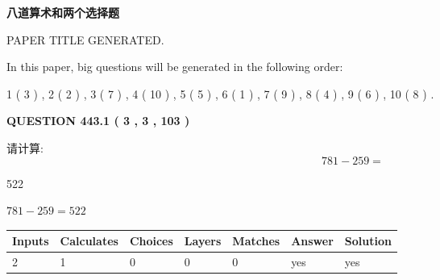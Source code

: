\documentclass{ctexart}
\begin{document}
   
\vspace{0.2in}
   
   
   
   
   
   
   
   
 \vspace{0.2in}
{\LARGE {\textbf{ 八道算术和两个选择题}}}
   
   
 PAPER TITLE GENERATED.
   
   
   
\vspace{0.2in}
   
In this paper, big questions will be generated in the following order: 
   
   
   1 ( 3 )
 ,
   2 ( 2 )
 ,
   3 ( 7 )
 ,
   4 ( 10 )
 ,
   5 ( 5 )
 ,
   6 ( 1 )
 ,
   7 ( 9 )
 ,
   8 ( 4 )
 ,
   9 ( 6 )
 ,
   10 ( 8 )
 .
  
\vspace{0.2in}
  
{\textbf{\Large{QUESTION
443.1 
 ( 3 , 3 , 103 )
}}}
  
  
 
请计算:
\begin{equation}
781 -   %
259 = \nonumber
\end{equation}
 
 
 
\noindent{}
 
 

522
 
 
\noindent{}
 
 

 
 
 
\noindent{}
 
 

$ %
781 -  %
259=   %
522$
 
 
\noindent{}
 
 

 
   
   
   
   
\noindent\begin{tabular}{|l|l|l|l|l|l|l|}
 \hline
Inputs & Calculates & Choices & Layers & Matches & Answer & Solution \\ \hline
 2  & 
 1  & 
 0
  & 
 0  & 
 0  & 
  yes & 
  yes 
  \\ \hline
 \end{tabular}
   
\end{document}
